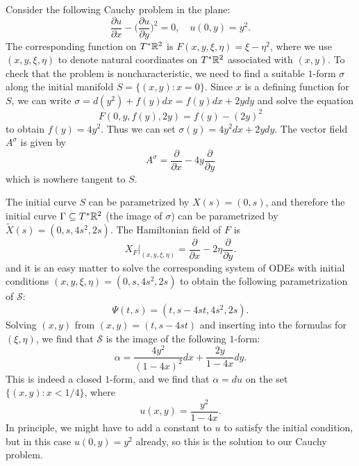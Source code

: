 \begin{example}
Consider the following Cauchy problem in the plane:
\[\frac{\partial u}{\partial x}-\Big(\frac{\partial u}{\partial y}\Big)^2=0,\quad u(0,y)=y^2.\]
The corresponding function on $T^*\mathbb{R}^2$ is $F(x,y,\xi,\eta)=\xi-\eta^2$, where we use $(x,y,\xi,\eta)$ to denote natural coordinates on $T^*\mathbb{R}^2$ associated with $(x,y)$. To check that the problem is noncharacteristic, we need to find a suitable $1$-form $\sigma$ along the initial manifold $S=\{(x,y):x=0\}$. Since $x$ is a defining function for $S$, we can write $\sigma=d(y^2)+f(y)dx=f(y)dx+2ydy$ and solve the equation
\[F(0,y,f(y),2y)=f(y)-(2y)^2\]
to obtain $f(y)=4y^2$. Thus we can set $\sigma(y)=4y^2dx+2ydy$. The vector field $A^\sigma$ is given by
\[A^\sigma=\frac{\partial}{\partial x}-4y\frac{\partial}{\partial y}\]
which is nowhere tangent to $S$.\par
The initial curve $S$ can be parametrized by $X(s)=(0,s)$, and therefore the initial curve $\Gamma\subseteq T^*\mathbb{R}^2$ (the image of $\sigma$) can be parametrized by $\widetilde{X}(s)=(0,s,4s^2,2s)$. The Hamiltonian field of $F$ is
\[X_F|_{(x,y,\xi,\eta)}=\frac{\partial}{\partial x}-2\eta\frac{\partial}{\partial y}.\]
and it is an easy matter to solve the corresponding system of ODEs with initial conditions $(x,y,\xi,\eta)=(0,s,4s^2,2s)$ to obtain the following parametrization of $\mathcal{S}$:
\[\varPsi(t,s)=(t,s-4st,4s^2,2s).\]
Solving $(x,y)$ from $(x,y)=(t,s-4st)$ and inserting into the formulas for $(\xi,\eta)$, we find that $\mathcal{S}$ is the image of the following $1$-form:
\[\alpha=\frac{4y^2}{(1-4x)^2}dx+\frac{2y}{1-4x}dy.\]
This is indeed a closed $1$-form, and we find that $\alpha=du$ on the set $\{(x,y):x<1/4\}$, where
\[u(x,y)=\frac{y^2}{1-4x}.\]
In principle, we might have to add a constant to $u$ to satisfy the initial condition, but in this case $u(0,y)=y^2$ already, so this is the solution to our Cauchy problem.
\end{example}
